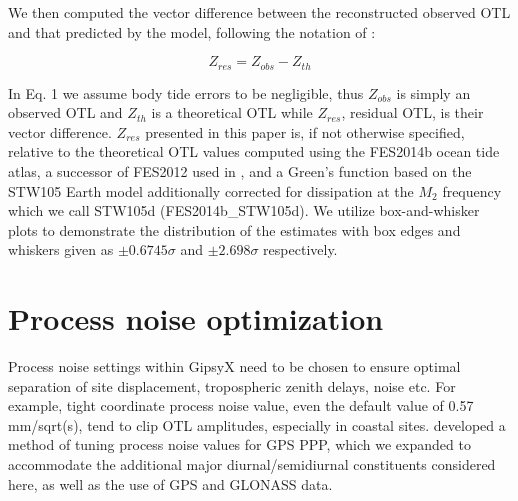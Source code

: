 \documentclass[se, manuscript]{copernicus}
\begin{document}
We then computed the vector difference between the reconstructed observed OTL and that predicted by the model, following the notation of \cite{Yuan2013}:

\begin{equation}
Z_{res} = Z_{obs}- Z_{th}
\end{equation}

In Eq. 1 we assume body tide errors to be negligible, thus $Z_{obs}$ is simply an observed OTL and $Z_{th}$ is a theoretical OTL while $Z_{res}$, residual OTL, is their vector difference. $Z_{res}$ presented in this paper is, if not otherwise specified, relative to the theoretical OTL values computed using the FES2014b ocean tide atlas, a successor of FES2012 used in \cite{Bos2015}, and a Green’s function based on the STW105 Earth model additionally corrected for dissipation at the $M_2$ frequency which we call STW105d (FES2014b\_STW105d).
We utilize box-and-whisker plots to demonstrate the distribution of the estimates with box edges and whiskers given as $\pm0.6745\sigma$ and $\pm2.698\sigma$ respectively.

\section{Process noise optimization}
Process noise settings within GipsyX need to be chosen to ensure optimal separation of site displacement, tropospheric zenith delays, noise etc. For example, tight coordinate process noise value, even the default value of 0.57 mm/sqrt(s), tend to clip OTL amplitudes, especially in coastal sites. \cite{Penna2015} developed a method of tuning process noise values for GPS PPP, which we expanded to accommodate the additional major diurnal/semidiurnal constituents considered here, as well as the use of GPS and GLONASS data.
\end{document}
